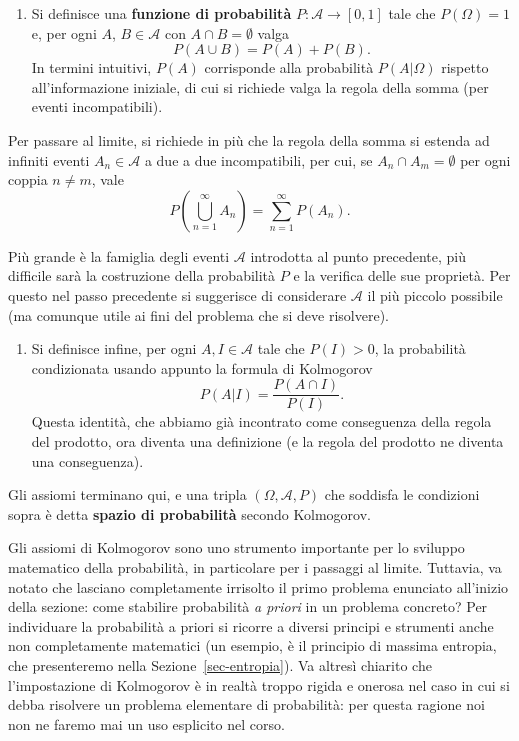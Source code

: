 \documentclass[
  italian,
  letterpaper,
]{book}
\providecommand{\tightlist}{%
  \setlength{\itemsep}{0pt}\setlength{\parskip}{0pt}}
\newcommand{\bra}[1]{\left( #1 \right)}
\theoremstyle{definition}
\theoremstyle{remark}
\begin{document}
\begin{enumerate}
\def\labelenumi{\alph{enumi})}
\setcounter{enumi}{2}
\tightlist
\item
  Si definisce una \textbf{funzione di probabilità}
  \(P: \mathcal{A} \to [0,1]\) tale che \(P(\Omega)= 1\) e, per ogni
  \(A\), \(B \in \mathcal{A}\) con \(A \cap B = \emptyset\) valga
  \[ P(A \cup B) = P(A)+ P(B).\] In termini intuitivi, \(P(A)\)
  corrisponde alla probabilità \(P(A|\Omega)\) rispetto all'informazione
  iniziale, di cui si richiede valga la regola della somma (per eventi
  incompatibili).
\end{enumerate}

Per passare al limite, si richiede in più che la regola della somma si
estenda ad infiniti eventi \(A_n \in \mathcal{A}\) a due a due
incompatibili, per cui, se \(A_n \cap A_m = \emptyset\) per ogni coppia
\(n\neq m\), vale
\[ P\bra{ \bigcup_{n=1}^\infty A_n } = \sum_{n=1}^\infty P(A_n).\]

Più grande è la famiglia degli eventi \(\mathcal{A}\) introdotta al
punto precedente, più difficile sarà la costruzione della probabilità
\(P\) e la verifica delle sue proprietà. Per questo nel passo precedente
si suggerisce di considerare \(\mathcal{A}\) il più piccolo possibile
(ma comunque utile ai fini del problema che si deve risolvere).

\begin{enumerate}
\def\labelenumi{\alph{enumi})}
\setcounter{enumi}{3}
\tightlist
\item
  Si definisce infine, per ogni \(A,I \in \mathcal{A}\) tale che
  \(P(I)>0\), la probabilità condizionata usando appunto la formula di
  Kolmogorov \[ P(A|I) = \frac{P(A \cap I)}{P(I)}.\] Questa identità,
  che abbiamo già incontrato come conseguenza della regola del prodotto,
  ora diventa una definizione (e la regola del prodotto ne diventa una
  conseguenza).
\end{enumerate}

Gli assiomi terminano qui, e una tripla \((\Omega, \mathcal{A}, P)\) che
soddisfa le condizioni sopra è detta \textbf{spazio di probabilità}
secondo Kolmogorov.

Gli assiomi di Kolmogorov sono uno strumento importante per lo sviluppo
matematico della probabilità, in particolare per i passaggi al limite.
Tuttavia, va notato che lasciano completamente irrisolto il primo
problema enunciato all'inizio della sezione: come stabilire probabilità
\emph{a priori} in un problema concreto? Per individuare la probabilità
a priori si ricorre a diversi principi e strumenti anche non
completamente matematici (un esempio, è il principio di massima
entropia, che presenteremo nella Sezione~\ref{sec-entropia}). Va altresì
chiarito che l'impostazione di Kolmogorov è in realtà troppo rigida e
onerosa nel caso in cui si debba risolvere un problema elementare di
probabilità: per questa ragione noi non ne faremo mai un uso esplicito
nel corso.
\end{document}
